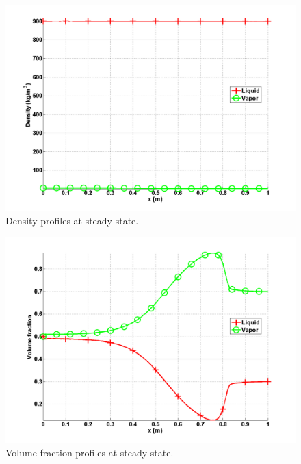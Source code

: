 %
\begin{figure}[H]
\centering
\includegraphics[width=\textwidth]{figures/SEM/Aint1e4_two_phases_density.png}
\caption{Density profiles at steady state.}
\label{fig:two-fluids-rel-nozzle-rho-sem-sect4}
\end{figure}
%
\begin{figure}[H]
\centering
\includegraphics[width=\textwidth]{figures/SEM/Aint1e4_two_phases_volume_fraction.png}
\caption{Volume fraction profiles at steady state.}
\label{fig:two-fluids-rel-nozzle-vf-sem-sect4}
\end{figure}
%
